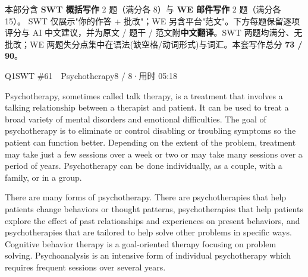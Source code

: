 
\vspace{1mm}
{\small\color{gray} 本部分含 \textbf{SWT 概括写作} 2 题（满分各 8）与 \textbf{WE 邮件写作} 2 题（满分各 15）。
SWT 仅展示"你的作答 + 批改"；WE 另含平台"范文"。下方每题保留逐项评分与 AI 中文建议，并为原文 / 题干 / 范文附\textbf{中文翻译}。SWT 两题均满分、无批改；WE 两题失分点集中在语法(缺空格/动词形式)与词汇。本套写作总分 \textbf{73 / 90}。}
\vspace{2mm}


\begin{qblock}{Q1\quad SWT \#61\ \ Psychotherapy}{8 / 8\quad·\quad 用时 05:18}

\begin{promptbox}
Psychotherapy, sometimes called talk therapy, is a treatment that involves a talking relationship between a therapist and patient. It can be used to treat a broad variety of mental disorders and emotional difficulties. The goal of psychotherapy is to eliminate or control disabling or troubling symptoms so the patient can function better. Depending on the extent of the problem, treatment may take just a few sessions over a week or two or may take many sessions over a period of years. Psychotherapy can be done individually, as a couple, with a family, or in a group.

There are many forms of psychotherapy. There are psychotherapies that help patients change behaviors or thought patterns, psychotherapies that help patients explore the effect of past relationships and experiences on present behaviors, and psychotherapies that are tailored to help solve other problems in specific ways. Cognitive behavior therapy is a goal-oriented therapy focusing on problem solving. Psychoanalysis is an intensive form of individual psychotherapy which requires frequent sessions over several years.
\end{promptbox}


\end{qblock}
